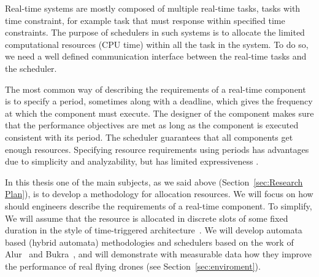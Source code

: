 \documentclass[11pt]{article}
\begin{document}
Real-time systems are mostly composed of multiple real-time tasks, tasks with time constraint, for example task that must response within specified time constraints.
The purpose of schedulers in such systems is to allocate the limited computational resources (CPU time) within all the task in the system. To do so, we need a well defined communication interface between the real-time tasks and the scheduler.

The most common way of describing the requirements of a real-time component is to specify a period, sometimes along with a deadline, which gives the frequency at which the component must execute. The designer of the component makes sure that the performance objectives are met as long as the component is executed consistent with its period. The scheduler guarantees that all components get enough resources.
Specifying resource requirements using periods has advantages due to simplicity and analyzability, but has limited expressiveness \cite{RTComposer}. 

In this thesis one of the main subjects, as we said above (Section~\ref{sec:Research Plan}), is to develop a methodology for allocation resources. We will focus on how should engineers describe the requirements of a real-time component.
To simplify, We will assume that the resource is allocated in discrete slots of some fixed duration in the style of time-triggered architecture~\cite{RTComposer}. %
We will develop automata based (hybrid automata) methodologies and schedulers based on the work of Alur~\cite{RTComposer} and Bukra~\cite{Merav}, and will demonstrate with measurable data how they improve the performance of real flying drones (see Section~\ref{sec:enviroment}).
\end{document}
